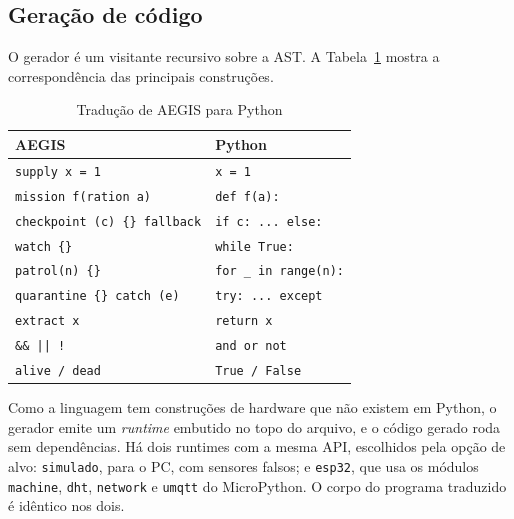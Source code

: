 \documentclass[conference]{IEEEtran}
\begin{document}
\subsection{Geração de código}

O gerador é um visitante recursivo sobre a AST. A Tabela~\ref{tab:traducao}
mostra a correspondência das principais construções.

\begin{table}[htbp]
\caption{Tradução de AEGIS para Python}
\label{tab:traducao}
\centering
\small
\begin{tabular}{@{}ll@{}}
\toprule
\textbf{AEGIS} & \textbf{Python} \\
\midrule
\texttt{supply x = 1}                 & \texttt{x = 1} \\
\texttt{mission f(ration a)}          & \texttt{def f(a):} \\
\texttt{checkpoint (c) \{\} fallback} & \texttt{if c: ... else:} \\
\texttt{watch \{\}}                   & \texttt{while True:} \\
\texttt{patrol(n) \{\}}               & \texttt{for \_ in range(n):} \\
\texttt{quarantine \{\} catch (e)}    & \texttt{try: ... except} \\
\texttt{extract x}                    & \texttt{return x} \\
\texttt{\&\& || !}                    & \texttt{and or not} \\
\texttt{alive / dead}                 & \texttt{True / False} \\
\bottomrule
\end{tabular}
\end{table}

Como a linguagem tem construções de hardware que não existem em Python, o
gerador emite um \textit{runtime} embutido no topo do arquivo, e o código
gerado roda sem dependências. Há dois runtimes com a mesma API, escolhidos
pela opção de alvo: \texttt{simulado}, para o PC, com sensores falsos; e
\texttt{esp32}, que usa os módulos \texttt{machine}, \texttt{dht},
\texttt{network} e \texttt{umqtt} do MicroPython. O corpo do programa
traduzido é idêntico nos dois.
\end{document}
